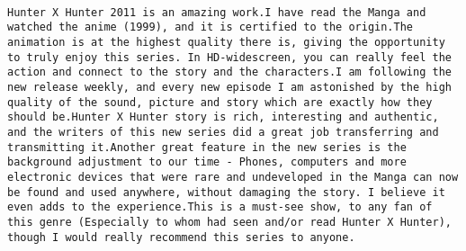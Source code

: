 \documentclass[
]{article}
\begin{document}
\begin{verbatim}
                                                                                                                                                                                                                                                                                                                                                                                                                                                                                                                                                                                                                                        Hunter X Hunter 2011 is an amazing work.I have read the Manga and watched the anime (1999), and it is certified to the origin.The animation is at the highest quality there is, giving the opportunity to truly enjoy this series. In HD-widescreen, you can really feel the action and connect to the story and the characters.I am following the new release weekly, and every new episode I am astonished by the high quality of the sound, picture and story which are exactly how they should be.Hunter X Hunter story is rich, interesting and authentic, and the writers of this new series did a great job transferring and transmitting it.Another great feature in the new series is the background adjustment to our time - Phones, computers and more electronic devices that were rare and undeveloped in the Manga can now be found and used anywhere, without damaging the story. I believe it even adds to the experience.This is a must-see show, to any fan of this genre (Especially to whom had seen and/or read Hunter X Hunter), though I would really recommend this series to anyone.

\end{verbatim}
\end{document}
